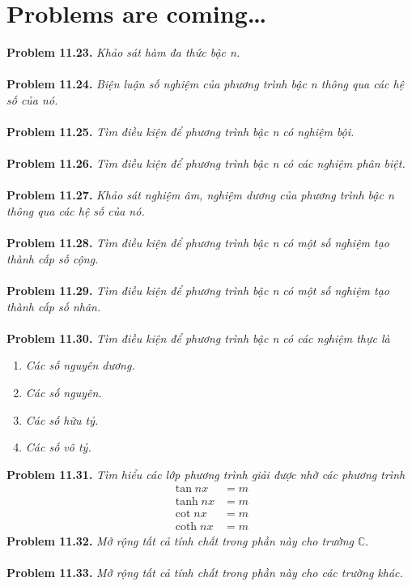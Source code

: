 \documentclass[a4paper,oneside]{book}
\numberwithin{equation}{chapter}
\begin{document}
\section{Problems are coming\ldots}
\textbf{Problem 11.23.} \textit{Khảo sát hàm đa thức bậc n.}\\
\\
\textbf{Problem 11.24.} \textit{Biện luận số nghiệm của phương trình bậc n thông qua các hệ số của nó.}\\
\\
\textbf{Problem 11.25.} \textit{Tìm điều kiện để phương trình bậc n có nghiệm bội.}\\
\\
\textbf{Problem 11.26.} \textit{Tìm điều kiện để phương trình bậc n có các nghiệm phân biệt.}\\
\\
\textbf{Problem 11.27.} \textit{Khảo sát nghiệm âm, nghiệm dương của phương trình bậc n thông qua các hệ số của nó.}\\
\\
\textbf{Problem 11.28.} \textit{Tìm điều kiện để phương trình bậc n có một số nghiệm tạo thành cấp số cộng.}\\
\\
\textbf{Problem 11.29.} \textit{Tìm điều kiện để phương trình bậc n có một số nghiệm tạo thành cấp số nhân.}\\
\\
\textbf{Problem 11.30.} \textit{Tìm điều kiện để phương trình bậc n có các nghiệm thực là}
\begin{enumerate}
\item \textit{Các số nguyên dương.}
\item \textit{Các số nguyên.}
\item \textit{Các số hữu tỷ.}
\item \textit{Các số vô tỷ.}
\end{enumerate}
\textbf{Problem 11.31.} \textit{Tìm hiểu các lớp phương trình giải được nhờ các phương trình}
\begin{align}
\tan nx &= m\\
\tanh  nx &= m\\
\cot nx &= m\\
\coth nx &= m
\end{align}
\textbf{Problem 11.32.} \textit{Mở rộng tất cả tính chất trong phần này cho trường $\mathbb{C}$}.\\
\\
\textbf{Problem 11.33.} \textit{Mở rộng tất cả tính chất trong phần này cho các trường khác.}\\
\end{document}
